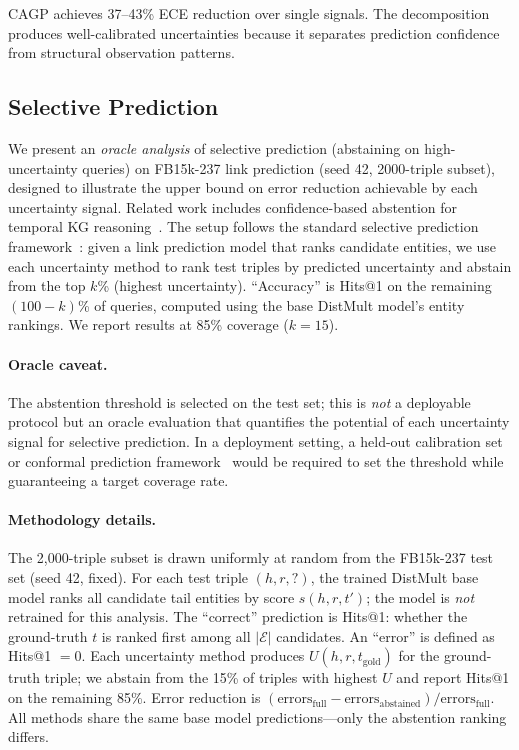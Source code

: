 \documentclass{article}
\begin{document}
CAGP achieves 37--43\% ECE reduction over single signals. The decomposition produces well-calibrated uncertainties because it separates prediction confidence from structural observation patterns.

\subsection{Selective Prediction}
\label{app:selective}

We present an \emph{oracle analysis} of selective prediction (abstaining on high-uncertainty queries) on FB15k-237 link prediction (seed 42, 2000-triple subset), designed to illustrate the upper bound on error reduction achievable by each uncertainty signal. Related work includes confidence-based abstention for temporal KG reasoning~\citep{hou2024selective}. The setup follows the standard selective prediction framework~\citep{geifman2017selective}: given a link prediction model that ranks candidate entities, we use each uncertainty method to rank test triples by predicted uncertainty and abstain from the top $k$\% (highest uncertainty). ``Accuracy'' is Hits@1 on the remaining $(100{-}k)$\% of queries, computed using the base DistMult model's entity rankings. We report results at 85\% coverage ($k{=}15$).

\paragraph{Oracle caveat.}
The abstention threshold is selected on the test set; this is \emph{not} a deployable protocol but an oracle evaluation that quantifies the potential of each uncertainty signal for selective prediction. In a deployment setting, a held-out calibration set or conformal prediction framework~\citep{zhu2025certainty} would be required to set the threshold while guaranteeing a target coverage rate.

\paragraph{Methodology details.}
The 2,000-triple subset is drawn uniformly at random from the FB15k-237 test set (seed 42, fixed). For each test triple $(h,r,?)$, the trained DistMult base model ranks all candidate tail entities by score $s(h,r,t')$; the model is \emph{not} retrained for this analysis. The ``correct'' prediction is Hits@1: whether the ground-truth $t$ is ranked first among all $|\mathcal{E}|$ candidates. An ``error'' is defined as Hits@1 $= 0$. Each uncertainty method produces $U(h,r,t_{\text{gold}})$ for the ground-truth triple; we abstain from the 15\% of triples with highest $U$ and report Hits@1 on the remaining 85\%. Error reduction is $(\text{errors}_{\text{full}} - \text{errors}_{\text{abstained}}) / \text{errors}_{\text{full}}$. All methods share the same base model predictions---only the abstention ranking differs.
\end{document}
